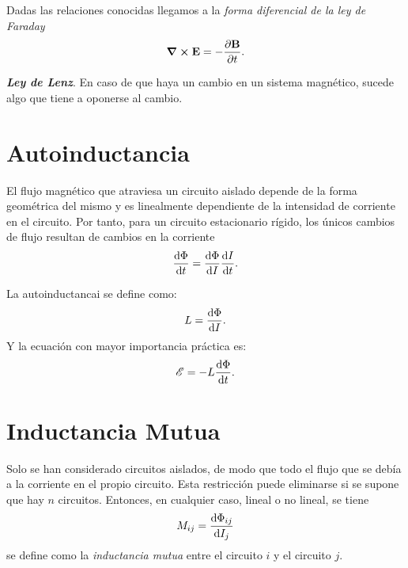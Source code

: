 Dadas las relaciones conocidas llegamos a la \textit{forma diferencial de la ley de Faraday}
\begin{equation}
    \curl{\vb{E}} = -\pdv{\vb{B}}{t}.
\end{equation}

\begin{tcolorbox}
    \textbf{\textit{Ley de Lenz}}. En caso de que haya un cambio en un sistema magnético, sucede algo que tiene a oponerse al cambio.
\end{tcolorbox}


\section{Autoinductancia}
El flujo magnético que atraviesa un circuito aislado depende de la forma geométrica del mismo y es linealmente dependiente de la intensidad de corriente en el circuito. Por tanto, para un circuito estacionario rígido, los únicos cambios de flujo resultan de cambios en la corriente
\begin{equation}
    \dv{\Phi}{t} = \dv{\Phi}{I} \dv{I}{t}.
\end{equation}
\begin{definition}
    La autoinductancai se define como:
    \begin{equation}
        L = \dv{\Phi}{I}.
    \end{equation}
    Y la ecuación con mayor importancia práctica es:
    \begin{equation}
        \mathscr{E} = -L\dv{\Phi}{t}.
    \end{equation}
\end{definition}



\section{Inductancia Mutua}
Solo se han considerado circuitos aislados, de modo que todo el flujo que se debía a la corriente en el propio circuito. Esta restricción puede eliminarse si se supone que hay $n$ circuitos. Entonces, en cualquier caso, lineal o no lineal, se tiene
\begin{equation}
    M_{ij} = \dv{\Phi_{ij}}{I_j}
\end{equation}
se define como la \textit{inductancia mutua} entre el circuito $i$ y el circuito $j$.


